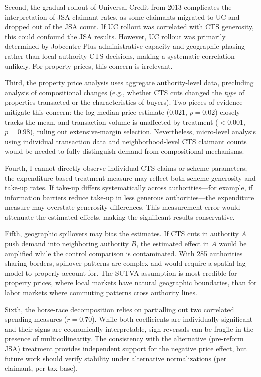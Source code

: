 \documentclass[12pt]{article}
\begin{document}
Second, the gradual rollout of Universal Credit from 2013 complicates the interpretation of JSA claimant rates, as some claimants migrated to UC and dropped out of the JSA count. If UC rollout was correlated with CTS generosity, this could confound the JSA results. However, UC rollout was primarily determined by Jobcentre Plus administrative capacity and geographic phasing rather than local authority CTS decisions, making a systematic correlation unlikely. For property prices, this concern is irrelevant.

Third, the property price analysis uses aggregate authority-level data, precluding analysis of compositional changes (e.g., whether CTS cuts changed the \textit{type} of properties transacted or the characteristics of buyers). Two pieces of evidence mitigate this concern: the log median price estimate (0.021, $p = 0.02$) closely tracks the mean, and transaction volume is unaffected by treatment ($< 0.001$, $p = 0.98$), ruling out extensive-margin selection. Nevertheless, micro-level analysis using individual transaction data and neighborhood-level CTS claimant counts would be needed to fully distinguish demand from compositional mechanisms.

Fourth, I cannot directly observe individual CTS claims or scheme parameters; the expenditure-based treatment measure may reflect both scheme generosity and take-up rates. If take-up differs systematically across authorities---for example, if information barriers reduce take-up in less generous authorities---the expenditure measure may overstate generosity differences. This measurement error would attenuate the estimated effects, making the significant results conservative.

Fifth, geographic spillovers may bias the estimates. If CTS cuts in authority $A$ push demand into neighboring authority $B$, the estimated effect in $A$ would be amplified while the control comparison is contaminated. With 285 authorities sharing borders, spillover patterns are complex and would require a spatial lag model to properly account for. The SUTVA assumption is most credible for property prices, where local markets have natural geographic boundaries, than for labor markets where commuting patterns cross authority lines.

Sixth, the horse-race decomposition relies on partialling out two correlated spending measures ($r = 0.70$). While both coefficients are individually significant and their signs are economically interpretable, sign reversals can be fragile in the presence of multicollinearity. The consistency with the alternative (pre-reform JSA) treatment provides independent support for the negative price effect, but future work should verify stability under alternative normalizations (per claimant, per tax base).
\end{document}
